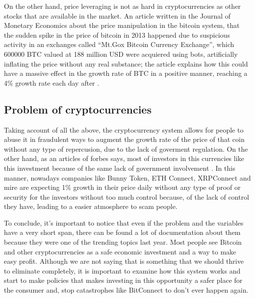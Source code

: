 \noindent On the other hand, price leveraging is not as hard in cryptocurrencies as other stocks that are available in the market. An article written in the Journal of Monetary Economics about the price manipulation in the bitcoin system, that the sudden spike in the price of bitcoin in 2013 happened due to suspicious activity in an exchanges called ``Mt.Gox Bitcoin Currency Exchange'', which 600000 BTC valued at 188 million USD were acquiered using bots, artificially inflating the price without any real substance; the article explains how this could have a massive effect in the growth rate of BTC in a positive manner, reaching a 4\% growth rate each day after \cite{PMitBE}.

\subsection{Problem of cryptocurrencies}
Taking account of all the above, the cryptocurrency system allows for people to abuse it in fraudulent ways to augment the growth rate of the price of that coin without any type of repercusion, due to the lack of goverment regulation. On the other hand, as an articles of forbes says, most of investors in this currencies like this investment because of the same lack of government involvement \cite{forbes}. In this manner, nowadays companies like Bunny Token, ETH Connect, XRPConnect and mire are expecting 1\% growth in their price daily without any type of proof or security for the investors without too much control because, of the lack of control they have, leading to a easier atmosphere to scam people.

\indent To conclude, it's important to notice that even if the problem and the variables have a very short span, there can be found a lot of documentation about them because they were one of the trending topics last year. Most people see Bitcoin and other cryptocurrencies as a safe economic investment and a way to make easy profit. Although we are not saying that is something that we should thrive to eliminate completely, it is important to examine how this system works and start to make policies that makes investing in this opportunity a safer place for the consumer and, stop catastrophes like BitConnect to don't ever happen again.


